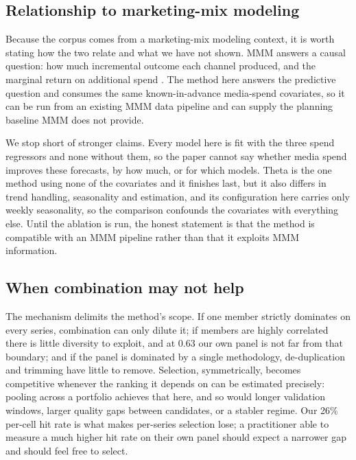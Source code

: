\documentclass[11pt]{article}
\begin{document}
\subsection{Relationship to marketing-mix modeling}

Because the corpus comes from a marketing-mix modeling context, it is worth stating how the two relate and what we have not shown. MMM answers a causal question: how much incremental outcome each channel produced, and the marginal return on additional spend \citep{jin2017,chan2017}. The method here answers the predictive question and consumes the same known-in-advance media-spend covariates, so it can be run from an existing MMM data pipeline and can supply the planning baseline MMM does not provide.

We stop short of stronger claims. Every model here is fit with the three spend regressors and none without them, so the paper cannot say whether media spend improves these forecasts, by how much, or for which models. Theta is the one method using none of the covariates and it finishes last, but it also differs in trend handling, seasonality and estimation, and its configuration here carries only weekly seasonality, so the comparison confounds the covariates with everything else. Until the ablation is run, the honest statement is that the method is compatible with an MMM pipeline rather than that it exploits MMM information.

\subsection{When combination may not help}
\label{sec:scope}

The mechanism delimits the method's scope. If one member strictly dominates on every series, combination can only dilute it; if members are highly correlated there is little diversity to exploit, and at 0.63 our own panel is not far from that boundary; and if the panel is dominated by a single methodology, de-duplication and trimming have little to remove. Selection, symmetrically, becomes competitive whenever the ranking it depends on can be estimated precisely: pooling across a portfolio achieves that here, and so would longer validation windows, larger quality gaps between candidates, or a stabler regime. Our 26\% per-cell hit rate is what makes per-series selection lose; a practitioner able to measure a much higher hit rate on their own panel should expect a narrower gap and should feel free to select.
\end{document}

